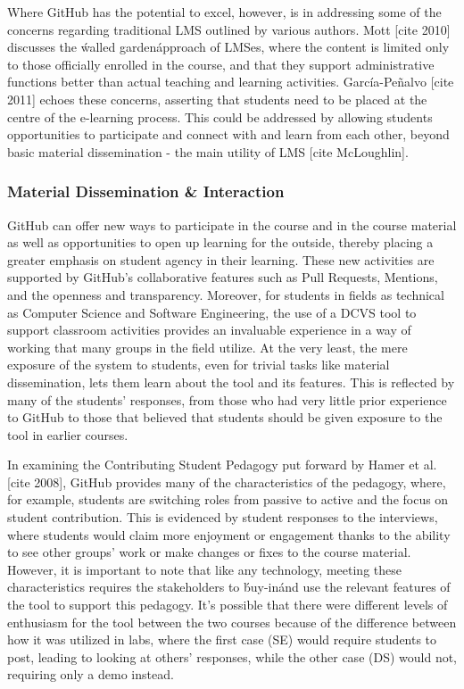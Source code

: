 Where GitHub has the potential to excel, however, is in addressing some of the concerns regarding traditional LMS outlined by various authors. Mott [cite 2010] discusses the \'walled garden\' approach of LMSes, where the content is limited only to those officially enrolled in the course, and that they support administrative functions better than actual teaching and learning activities. García-Peñalvo [cite 2011] echoes these concerns, asserting that students need to be placed at the centre of the e-learning process. This could be addressed by allowing students opportunities to participate and connect with and learn from each other, beyond basic material dissemination - the main utility of LMS [cite McLoughlin].

\subsubsection{Material Dissemination & Interaction}
GitHub can offer new ways to participate in the course and in the course material as well as opportunities to open up learning for the outside, thereby placing a greater emphasis on student agency in their learning. These new activities are supported by GitHub's collaborative features such as Pull Requests, Mentions, and the openness and transparency. Moreover, for students in fields as technical as Computer Science and Software Engineering, the use of a DCVS tool to support classroom activities provides an invaluable experience in a way of working that many groups in the field utilize. At the very least, the mere exposure of the system to students, even for trivial tasks like material dissemination, lets them learn about the tool and its features. This is reflected by many of the students' responses, from those who had very little prior experience to GitHub to those that believed that students should be given exposure to the tool in earlier courses.

In examining the Contributing Student Pedagogy put forward by Hamer et al. [cite 2008], GitHub provides many of the characteristics of the pedagogy, where, for example, students are switching roles from passive to active and the focus on student contribution. %
This is evidenced by student responses to the interviews, where students would claim more enjoyment or engagement thanks to the ability to see other groups' work or make changes or fixes to the course material. However, it is important to note that like any technology, meeting these characteristics requires the stakeholders to \'buy-in\' and use the relevant features of the tool to support this pedagogy. It's possible that there were different levels of enthusiasm for the tool between the two courses because of the difference between how it was utilized in labs, where the first case (SE) would require students to post, leading to looking at others' responses, while the other case (DS) would not, requiring only a demo instead.

